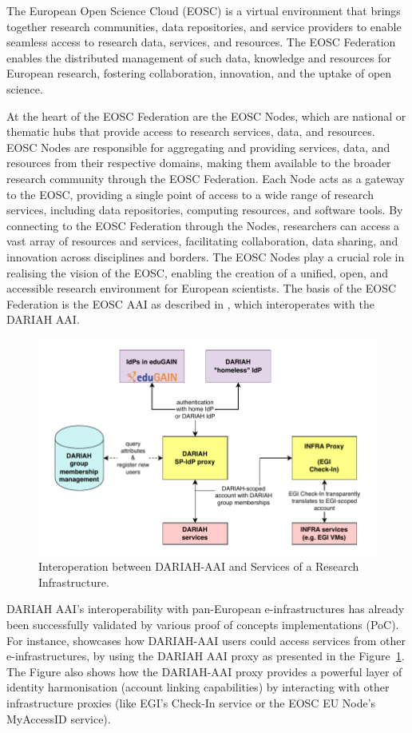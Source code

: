 \documentclass[final]{anthology-ch} %
\begin{document}
The European Open Science Cloud (EOSC) \cite{web_eosc} is a virtual environment that brings together research communities, data repositories, and service providers to enable seamless access to research data, services, and resources. 
The EOSC Federation~\cite{eosc_association_2025_14999577} enables the distributed management of such data, knowledge and resources for European research, fostering collaboration, innovation, and the uptake of open science.

At the heart of the EOSC Federation are the EOSC Nodes, which are national or thematic hubs that provide access to research services, data, and resources. EOSC Nodes are responsible for aggregating and providing services, data, and resources from their respective domains, making them available to the broader research community through the EOSC Federation. Each Node acts as a gateway to the EOSC, providing a single point of access to a wide range of research services, including data repositories, computing resources, and software tools. By connecting to the EOSC Federation through the Nodes, researchers can access a vast array of resources and services, facilitating collaboration, data sharing, and innovation across disciplines and borders. The EOSC Nodes play a crucial role in realising the vision of the EOSC, enabling the creation of a unified, open, and accessible research environment for European scientists. The basis of the EOSC Federation is the EOSC AAI as described in \cite{kanellopoulos_2025_15388270}, which interoperates with the DARIAH AAI.

\begin{figure}[t!]
  \centering
  \includegraphics[width=0.7\linewidth]{figures/Figure_dariahaai2-v2.pdf}
  \caption{Interoperation between DARIAH-AAI and Services of a Research Infrastructure.}
  \label{fig:dariahaai2}
\end{figure}

DARIAH AAI's interoperability with pan-European e-infrastructures 
has already been successfully validated by various proof of concepts implementations (PoC).
For instance, \cite{dariah_poc} showcases how 
DARIAH-AAI users could access services from other e-infrastructures, by using the DARIAH AAI proxy as presented in the Figure~\ref{fig:dariahaai2}.
The Figure also shows how the DARIAH-AAI proxy provides a powerful layer of identity harmonisation (account linking capabilities) by interacting with other infrastructure proxies (like EGI's Check-In service or the EOSC EU Node's MyAccessID service).
\end{document}
